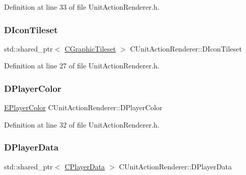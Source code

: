 Definition at line 33 of file Unit\+Action\+Renderer.\+h.

\hypertarget{classCUnitActionRenderer_a3f5f7cf1840e1aa4b28ab507404a6b3a}{}\label{classCUnitActionRenderer_a3f5f7cf1840e1aa4b28ab507404a6b3a} 
\subsubsection{\texorpdfstring{D\+Icon\+Tileset}{DIconTileset}}
{\footnotesize\ttfamily std\+::shared\+\_\+ptr$<$ \hyperlink{classCGraphicTileset}{C\+Graphic\+Tileset} $>$ C\+Unit\+Action\+Renderer\+::\+D\+Icon\+Tileset\hspace{0.3cm}{\ttfamily [protected]}}



Definition at line 27 of file Unit\+Action\+Renderer.\+h.

\hypertarget{classCUnitActionRenderer_a092d5c46d431f75499b194dc7b385ceb}{}\label{classCUnitActionRenderer_a092d5c46d431f75499b194dc7b385ceb} 
\subsubsection{\texorpdfstring{D\+Player\+Color}{DPlayerColor}}
{\footnotesize\ttfamily \hyperlink{GameDataTypes_8h_aafb0ca75933357ff28a6d7efbdd7602f}{E\+Player\+Color} C\+Unit\+Action\+Renderer\+::\+D\+Player\+Color\hspace{0.3cm}{\ttfamily [protected]}}



Definition at line 32 of file Unit\+Action\+Renderer.\+h.

\hypertarget{classCUnitActionRenderer_a77f8e3045992a48b27ad6e45d48a7b91}{}\label{classCUnitActionRenderer_a77f8e3045992a48b27ad6e45d48a7b91} 
\subsubsection{\texorpdfstring{D\+Player\+Data}{DPlayerData}}
{\footnotesize\ttfamily std\+::shared\+\_\+ptr$<$ \hyperlink{classCPlayerData}{C\+Player\+Data} $>$ C\+Unit\+Action\+Renderer\+::\+D\+Player\+Data\hspace{0.3cm}{\ttfamily [protected]}}



